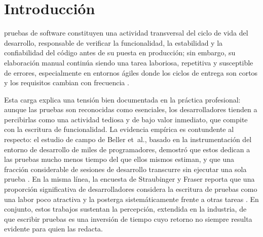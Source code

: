 \documentclass[10pt,journal,twoside,letterpaper]{IEEEtran}
\begin{document}
	\section{Introducción}
	\label{sec:introduccion}

	 pruebas de software constituyen una actividad transversal del ciclo de vida del desarrollo, responsable de verificar la funcionalidad, la estabilidad y la confiabilidad del código antes de su puesta en producción; sin embargo, su elaboración manual continúa siendo una tarea laboriosa, repetitiva y susceptible de errores, especialmente en entornos ágiles donde los ciclos de entrega son cortos y los requisitos cambian con frecuencia \cite{lukasczyk2023empirical,wang2024survey}.

	Esta carga explica una tensión bien documentada en la práctica profesional: aunque las pruebas son reconocidas como esenciales, los desarrolladores tienden a percibirlas como una actividad tediosa y de bajo valor inmediato, que compite con la escritura de funcionalidad. La evidencia empírica es contundente al respecto: el estudio de campo de Beller et~al., basado en la instrumentación del entorno de desarrollo de miles de programadores, demostró que estos dedican a las pruebas mucho menos tiempo del que ellos mismos estiman, y que una fracción considerable de sesiones de desarrollo transcurre sin ejecutar una sola prueba \cite{beller2015test}. En la misma línea, la encuesta de Straubinger y Fraser reporta que una proporción significativa de desarrolladores considera la escritura de pruebas como una labor poco atractiva y la posterga sistemáticamente frente a otras tareas \cite{straubinger2023survey}. En conjunto, estos trabajos sustentan la percepción, extendida en la industria, de que escribir pruebas es una inversión de tiempo cuyo retorno no siempre resulta evidente para quien las redacta.
\end{document}
